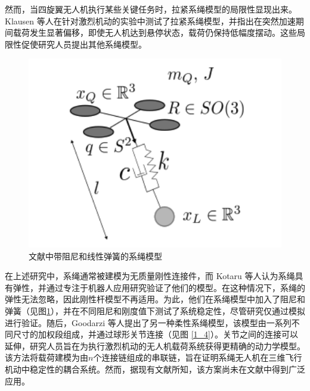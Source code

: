 \documentclass[lang=chs, degree=master, blindreview=false, winfonts=true]{yanputhesis}
\begin{document}
然而，当四旋翼无人机执行某些关键任务时，拉紧系绳模型的局限性显现出来\cite{castillo2019disturbance,estevez2021hybrid}。Klausen 等人在针对激烈机动的实验中测试了拉紧系绳模型，并指出在突然加速期间载荷发生显著偏移，即使无人机达到悬停状态，载荷仍保持低幅度摆动\cite{klausen2017nonlinear}。这些局限性促使研究人员提出其他系绳模型。


\begin{figure}[hbt!]
	\centering 
	\includegraphics[width=28pc]{picture/1_3.png} 
	\caption{文献中带阻尼和线性弹簧的系绳模型} \label{1_3}
\end{figure}
在上述研究中，系绳通常被建模为无质量刚性连接件，而 Kotaru 等人认为系绳具有弹性，并通过专注于机器人应用研究验证了他们的模型\cite{kotaru2017dynamics}。在这种情况下，系绳的弹性无法忽略，因此刚性杆模型不再适用。为此，他们在系绳模型中加入了阻尼和弹簧（见图\ref{1_3}），并在不同阻尼和刚度值下测试了系统稳定性，尽管研究仅通过模拟进行验证。随后，Goodarzi 等人提出了另一种柔性系绳模型，该模型由一系列不同尺寸的加权段组成，并通过球形关节连接\cite{goodarzi2015geometric}（见图 \ref{1_4}）。关节之间的连接可以延伸，研究人员旨在为执行激烈机动的无人机载荷系统获得更精确的动力学模型。该方法将载荷建模为由$n$个连接链组成的串联链，旨在证明系绳无人机在三维飞行机动中稳定性的耦合系统。然而，据现有文献所知，该方案尚未在文献中得到广泛应用。
\end{document}
